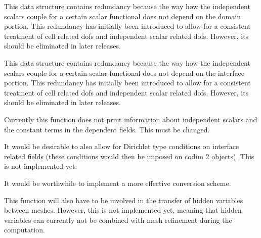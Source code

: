 \begin{DoxyRefList}
%
This data structure contains redundancy because the way how the independent scalars couple for a certain scalar functional does not depend on the domain portion. This redundancy has initially been introduced to allow for a consistent treatment of cell related dofs and independent scalar related dofs. However, its should be eliminated in later releases. 
\item[Member \mbox{\hyperlink{class_assembly_helper_a311e176038ee2b7ca0719abb384ca57b}{Assembly\+Helper$<$ spacedim $>$::coupled\+\_\+\+C\+\_\+indices\+\_\+scalar\+\_\+functionals\+\_\+interface}} ]\label{todo__todo000004}%
%
This data structure contains redundancy because the way how the independent scalars couple for a certain scalar functional does not depend on the interface portion. This redundancy has initially been introduced to allow for a consistent treatment of cell related dofs and independent scalar related dofs. However, its should be eliminated in later releases.  
\item[Member \mbox{\hyperlink{class_assembly_helper_a6a6f8ff7c1a8910d84beb7761b5c821b}{Assembly\+Helper$<$ spacedim $>$::print\+\_\+assembly\+\_\+helper\+\_\+definition}} (const bool detailed\+\_\+printout\+\_\+shapefuns=true) const]\label{todo__todo000006}%
%
Currently this function does not print information about independent scalars and the constant terms in the dependent fields. This must be changed. 
\item[Class \mbox{\hyperlink{class_dirichlet_constraint}{Dirichlet\+Constraint$<$ spacedim $>$}} ]\label{todo__todo000008}%
%
It would be desirable to also allow for Dirichlet type conditions on interface related fields (these conditions would then be imposed on codim 2 objects). This is not implemented yet. 
\item[Member \mbox{\hyperlink{class_do_f_renumbering_offset_a5df6c4b70b1394c3670ced634146c9a9}{Do\+F\+Renumbering\+Offset::dof\+\_\+offsets}} ]\label{todo__todo000009}%
%
It would be worthwhile to implement a more effective conversion scheme.  
\item[Member \mbox{\hyperlink{classparallel_1_1_triangulation_system_a951181f2ad877283d458fa19db42efb2}{parallel::Triangulation\+System$<$ spacedim $>$::post\+\_\+refinement\+\_\+domain}} ()]\label{todo__todo000014}%
%
This function will also have to be involved in the transfer of hidden variables between meshes. However, this is not implemented yet, meaning that hidden variables can currently not be combined with mesh refinement during the computation.  

\end{DoxyRefList}

